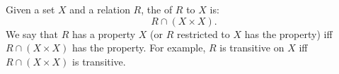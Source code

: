 Given a set $X$ and a relation $R$, the  of $R$ to $X$ is:
$$
R \cap (X \times X).
$$
We say that $R$ has a property  $X$ (or $R$ restricted to $X$ has the property) iff $R \cap (X \times X)$ has the property. For example, $R$ is transitive on $X$ iff $R \cap (X \times X)$ is transitive.
